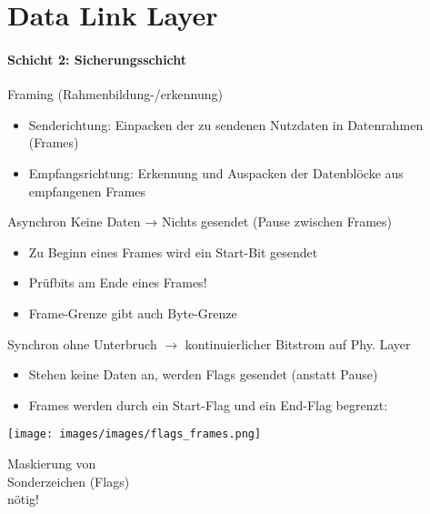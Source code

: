 \section{Data Link Layer}
\paragraph{Schicht 2: Sicherungsschicht}

\begin{definition}{Framing (Rahmenbildung-/erkennung)}
    \begin{itemize}
        \item Senderichtung: Einpacken der zu sendenen Nutzdaten in Datenrahmen (Frames)
        \item Empfangsrichtung: Erkennung und Auspacken der Datenblöcke aus empfangenen Frames
    \end{itemize}
\end{definition}

\begin{concept}{Asynchron}
    {\small Keine Daten → Nichts gesendet (Pause zwischen Frames)}
    \begin{itemize}
        \item Zu Beginn eines Frames wird ein Start-Bit gesendet
        \item Prüfbits am Ende eines Frames!
        \item Frame-Grenze gibt auch Byte-Grenze
    \end{itemize}
\end{concept}

\begin{concept}{Synchron}
    {\small ohne Unterbruch $\rightarrow$ kontinuierlicher Bitstrom auf Phy. Layer}
    \begin{itemize}
        \item Stehen keine Daten an, werden Flags gesendet (anstatt Pause)
        \item Frames werden durch ein Start-Flag und ein End-Flag begrenzt:
    \end{itemize}
    \begin{minipage}{0.6\linewidth}
        \texttt{[image: images/images/flags\_frames.png]}
    \end{minipage}
    \begin{minipage}{0.39\linewidth}
        Maskierung von\\ Sonderzeichen (Flags)\\ nötig!
    \end{minipage}
\end{concept}

